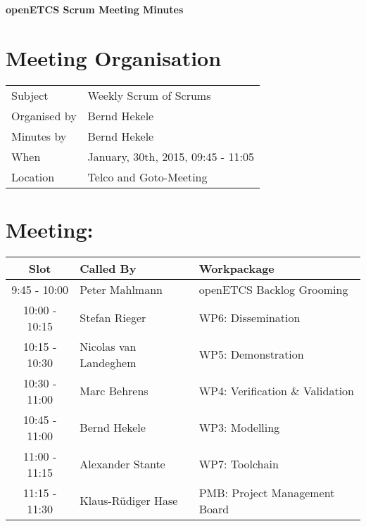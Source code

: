 \documentclass[a4paper, 11pt]{article}
\begin{document}
{\begin{center}\huge\bf openETCS Scrum Meeting Minutes\end{center}}
\section{Meeting Organisation}

\renewcommand{\arraystretch}{1.5}
\begin{supertabular}{m{.2\textwidth}m{.8\textwidth}}
Subject & Weekly Scrum of Scrums\\
Organised by &Bernd Hekele\\
Minutes by & Bernd Hekele\\
When & January, 30th, 2015, 09:45 - 11:05\\
Location & Telco and Goto-Meeting\\
\end{supertabular}

\renewcommand{\arraystretch}{1.0}
\section{Meeting:}

\begin{tabular}{|c|l|l|}
\hline
\textbf{Slot} &  \textbf{Called By} & \textbf{Workpackage} \\
\hline  
9:45 - 10:00 & Peter Mahlmann & openETCS Backlog Grooming  \\\hline
10:00 - 10:15 & Stefan Rieger & WP6: Dissemination \\\hline  
10:15 - 10:30 & Nicolas van Landeghem & WP5: Demonstration \\\hline  
10:30 - 11:00 & Marc Behrens & WP4: Verification \& Validation \\\hline  
10:45 - 11:00 & Bernd Hekele & WP3: Modelling \\\hline  
11:00 - 11:15 & Alexander Stante  & WP7: Toolchain \\\hline
11:15 - 11:30 & Klaus-R\"udiger Hase & PMB: Project Management Board \\\hline  
\end{tabular}
\end{document}

